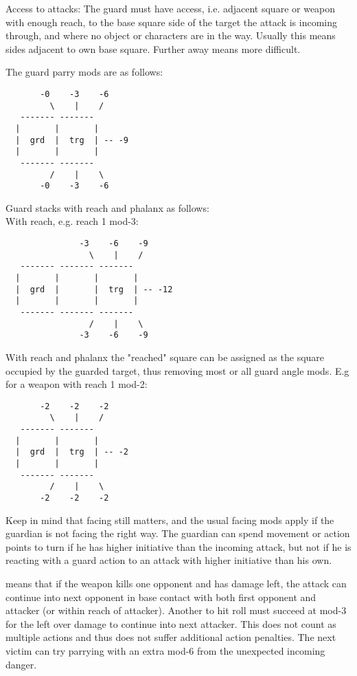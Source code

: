 Access to attacks: The guard must have access, i.e. adjacent square or weapon with enough reach, to the base square side of the target the attack is incoming through, and where no object or characters are in the way. Usually this means sides adjacent to own base square. Further away means more difficult.

The guard parry mods are as follows:
\begin{samepage} \small \begin{verbatim}
       -0    -3    -6
         \    |    /
   ------- -------
  |       |       |
  |  grd  |  trg  | -- -9
  |       |       |
   ------- -------
         /    |    \
       -0    -3    -6
\end{verbatim} \normalsize \end{samepage}

Guard stacks with reach and phalanx as follows:\\
With reach, e.g. reach 1 mod-3:
\begin{samepage} \small \begin{verbatim}
               -3    -6    -9
                 \    |    /
   ------- ------- -------
  |       |       |       |
  |  grd  |       |  trg  | -- -12
  |       |       |       |
   ------- ------- -------
                 /    |    \
               -3    -6    -9
\end{verbatim} \normalsize \end{samepage}

With reach and phalanx the "reached" square can be assigned as the square occupied by the guarded target, thus removing most or all guard angle mods. E.g for a weapon with reach 1 mod-2:
\begin{samepage} \small \begin{verbatim}
       -2    -2    -2
         \    |    /
   ------- -------
  |       |       |
  |  grd  |  trg  | -- -2
  |       |       |
   ------- -------
         /    |    \
       -2    -2    -2
\end{verbatim} \normalsize \end{samepage}

Keep in mind that facing still matters, and the usual facing mods apply if the guardian is not facing the right way. The guardian can spend movement or action points to turn if he has higher initiative than the incoming attack, but not if he is reacting with a guard action to an attack with higher initiative than his own.


\skill{Maneuver (cost 10) "sweep":} means that if the weapon kills one opponent and has damage left, the attack can continue into next opponent in base contact with both first opponent and attacker (or within reach of attacker). Another to hit roll must succeed at mod-3 for the left over damage to continue into next attacker. This does not count as multiple actions and thus does not suffer additional action penalties. The next victim can try parrying with an extra mod-6 from the unexpected incoming danger.

